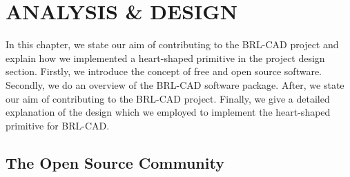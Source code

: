 
\chapter{ANALYSIS \& DESIGN} %

\label{Analysis \& Design} %



\hspace{30} In this chapter,   we   state   our   aim   of   contributing   to   the   BRL-­CAD   project  
and   explain   how   we   implemented   a   heart-shaped   primitive   in   the   project   design  
section.   Firstly,   we   introduce   the   concept   of   free   and   open   source   software. Secondly,   we   do   an   overview   of   the   BRL-­CAD   software   package.   After,   we  state   our   aim   of   contributing   to   the   BRL-­CAD   project.   Finally,   we   give   a   detailed  explanation   of   the   design   which   we   employed   to   implement   the   heart-­shaped primitive for BRL-CAD.

\section{The Open Source Community}

